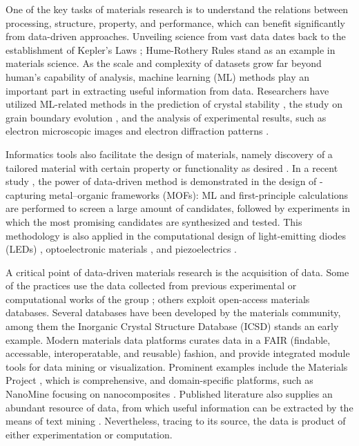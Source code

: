 One of the key tasks of materials research is to understand the relations between processing, structure, property, and performance, which can benefit significantly from data-driven approaches. Unveiling science from vast data dates back to the establishment of Kepler's Laws \parencite{4Para}; Hume-Rothery Rules stand as an example in materials science. As the scale and complexity of datasets grow far beyond human's capability of analysis, machine learning (ML) methods play an important part in extracting useful information from data. Researchers have utilized ML-related methods in the prediction of crystal stability \parencite{XtalStability}, the study on grain boundary evolution \parencite{gbdynamics}, and the analysis of experimental results, such as electron microscopic images \parencite{defect_in_EM} and electron diffraction patterns \parencite{EBSD_ML}.

Informatics tools also facilitate the design of materials, namely discovery of a tailored material with certain property or functionality as desired \parencite{InverseMolDesign}. In a recent study \parencite{MOFScreen}, the power of data-driven method is demonstrated in the design of -capturing metal--organic frameworks (MOFs): ML and first-principle calculations are performed to screen a large amount of candidates, followed by experiments in which the most promising candidates are synthesized and tested. This methodology is also applied in the computational design of light-emitting diodes (LEDs) \parencite{LEDScreen}, optoelectronic materials \parencite{Optoelectronic}, and piezoelectrics \parencite{Piezoelectrics}.

A critical point of data-driven materials research is the acquisition of data. Some of the practices use the data collected from previous experimental or computational works of the group \parencite{FailedExp}; others exploit open-access materials databases. Several databases have been developed by the materials community, among them the Inorganic Crystal Structure Database (ICSD) \parencite{ICSD} stands an early example. Modern materials data platforms curates data in a FAIR (findable, accessable, interoperatable, and reusable) fashion, and provide integrated module tools for data mining or visualization. Prominent examples include the Materials Project \parencite{MatProj}, which is comprehensive, and domain-specific platforms, such as NanoMine focusing on nanocomposites \parencite{NanoMine}. Published literature also supplies an abundant resource of data, from which useful information can be extracted by the means of text mining \parencite{CederTM,Zeolite}. Nevertheless, tracing to its source, the data is product of either experimentation or computation.

